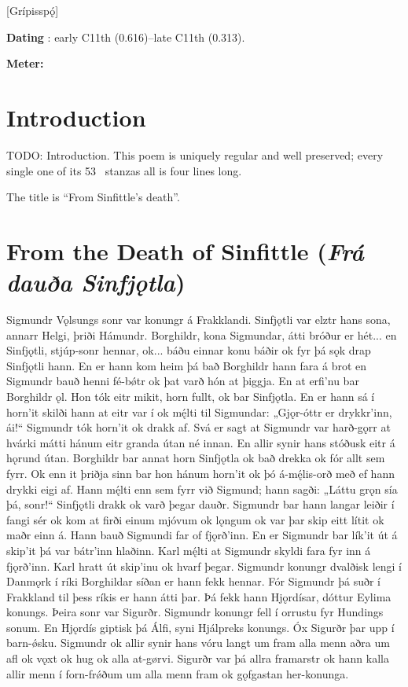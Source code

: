 [Grípisspǫ́]

\begin{flushright}%
\textbf{Dating} \parencite{Sapp2022}: early C11th (0.616)–late C11th (0.313).

\textbf{Meter:} \Fornyrdislag%
\end{flushright}

\section{Introduction}

TODO: Introduction.  This poem is uniquely regular and well preserved; every single one of its 53 \Fornyrdislag\ stanzas all is four lines long.

The title is “From Sinfittle’s death”.

\section{From the Death of Sinfittle (\emph{Frá dauða Sinfjǫtla})}

\sectionline

\bpg\bpa Sigmundr Vǫlsungs sonr var konungr á Frakklandi. Sinfjǫtli var elztr hans sona, annarr Helgi, þriði Hámundr. Borghildr, kona Sigmundar, átti bróður er hét... en Sinfjǫtli, stjúp-sonr hennar, ok... báðu einnar konu báðir ok fyr þá sǫk drap Sinfjǫtli hann. En er hann kom heim þá bað Borghildr hann fara á brot en Sigmundr bauð henni fé-bǿtr ok þat varð hón at þiggja. En at erfi’nu bar Borghildr ǫl. Hon tók eitr mikit, horn fullt, ok bar Sinfjǫtla.  En er hann sá í horn’it skilði hann at eitr var í ok mę́lti til Sigmundar: „Gjǫr-óttr er drykkr’inn, ái!“  Sigmundr tók horn’it ok drakk af.  Svá er sagt at Sigmundr var harð-gǫrr at hvárki mátti hánum eitr granda útan né innan.  En allir synir hans stóðusk eitr á hǫrund útan.  Borghildr bar annat horn Sinfjǫtla ok bað drekka ok fór allt sem fyrr.  Ok enn it þriðja sinn bar hon hánum horn’it ok þó á-mę́lis-orð með ef hann drykki eigi af.  Hann mę́lti enn sem fyrr við Sigmund; hann sagði: „Láttu grǫn sía þá, sonr!“  Sinfjǫtli drakk ok varð þegar dauðr.  Sigmundr bar hann langar leiðir í fangi sér ok kom at firði einum mjóvum ok lǫngum ok var þar skip eitt lítit ok maðr einn á.  Hann bauð Sigmundi far of fjǫrð’inn.  En er Sigmundr bar lík’it út á skip’it þá var bátr’inn hlaðinn.  Karl mę́lti at Sigmundr skyldi fara fyr inn á fjǫrð’inn.  Karl hratt út skip’inu ok hvarf þegar.  Sigmundr konungr dvalðisk lengi í Danmǫrk í ríki Borghildar síðan er hann fekk hennar.  Fór Sigmundr þá suðr í Frakkland til þess ríkis er hann átti þar.  Þá fekk hann Hjǫrdísar, dóttur Eylima konungs.  Þeira sonr var Sigurðr.  Sigmundr konungr fell í orrustu fyr Hundings sonum.  En Hjǫrdís giptisk þá Álfi, syni Hjálpreks konungs.  Óx Sigurðr þar upp í barn-ǿsku.  Sigmundr ok allir synir hans vóru langt um fram alla menn aðra um afl ok vǫxt ok hug ok alla at-gørvi.  Sigurðr var þá allra framarstr ok hann kalla allir menn í forn-frǿðum um alla menn fram ok gǫfgastan her-konunga.\epa

